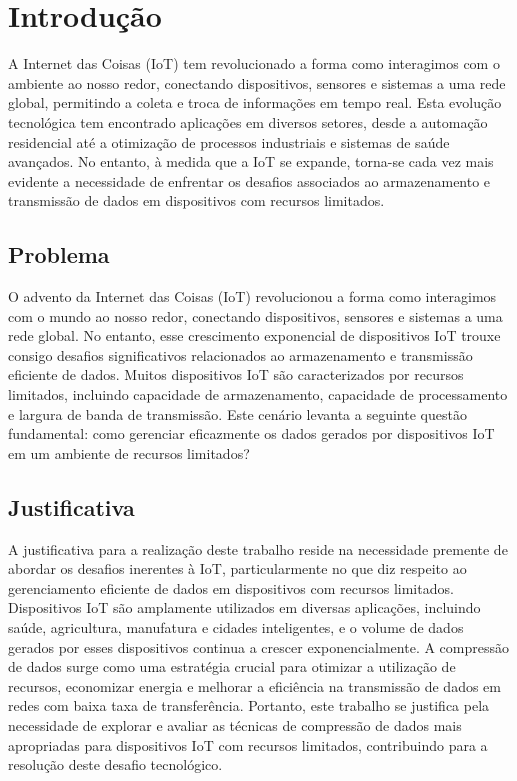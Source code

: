 \chapter{Introdução}
\label{cap:introducao}
A Internet das Coisas (IoT) tem revolucionado a forma como interagimos com o ambiente ao nosso redor, conectando dispositivos, sensores e sistemas a uma rede global, permitindo a coleta e troca de informações em tempo real. Esta evolução tecnológica tem encontrado aplicações em diversos setores, desde a automação residencial até a otimização de processos industriais e sistemas de saúde avançados. No entanto, à medida que a IoT se expande, torna-se cada vez mais evidente a necessidade de enfrentar os desafios associados ao armazenamento e transmissão de dados em dispositivos com recursos limitados.

\section{Problema}
\label{sec:problema}

O advento da Internet das Coisas (IoT) revolucionou a forma como interagimos com o mundo ao nosso redor, conectando dispositivos, sensores e sistemas a uma rede global. No entanto, esse crescimento exponencial de dispositivos IoT trouxe consigo desafios significativos relacionados ao armazenamento e transmissão eficiente de dados. Muitos dispositivos IoT são caracterizados por recursos limitados, incluindo capacidade de armazenamento, capacidade de processamento e largura de banda de transmissão. Este cenário levanta a seguinte questão fundamental: como gerenciar eficazmente os dados gerados por dispositivos IoT em um ambiente de recursos limitados?

\section{Justificativa}
\label{sec:justificativa}

A justificativa para a realização deste trabalho reside na necessidade premente de abordar os desafios inerentes à IoT, particularmente no que diz respeito ao gerenciamento eficiente de dados em dispositivos com recursos limitados. Dispositivos IoT são amplamente utilizados em diversas aplicações, incluindo saúde, agricultura, manufatura e cidades inteligentes, e o volume de dados gerados por esses dispositivos continua a crescer exponencialmente. A compressão de dados surge como uma estratégia crucial para otimizar a utilização de recursos, economizar energia e melhorar a eficiência na transmissão de dados em redes com baixa taxa de transferência. Portanto, este trabalho se justifica pela necessidade de explorar e avaliar as técnicas de compressão de dados mais apropriadas para dispositivos IoT com recursos limitados, contribuindo para a resolução deste desafio tecnológico.

